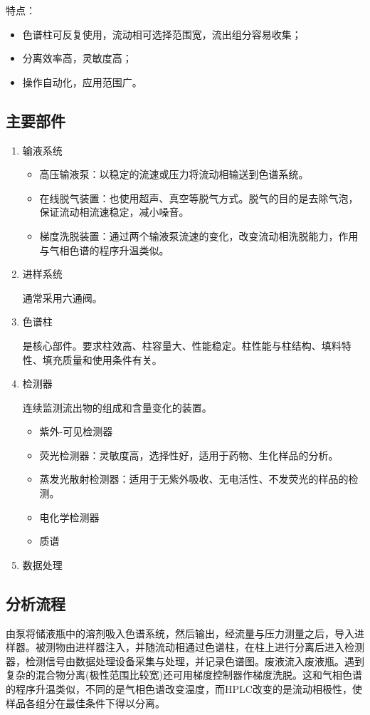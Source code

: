 特点：
\begin{itemize}
	\item 色谱柱可反复使用，流动相可选择范围宽，流出组分容易收集；
	\item 分离效率高，灵敏度高；
	\item 操作自动化，应用范围广。
\end{itemize}

\subsection{主要部件}
\begin{enumerate}
	\item 输液系统
	\begin{itemize}
		\item 高压输液泵：以稳定的流速或压力将流动相输送到色谱系统。
		\item 在线脱气装置：也使用超声、真空等脱气方式。脱气的目的是去除气泡，保证流动相流速稳定，减小噪音。
		\item 梯度洗脱装置：通过两个输液泵流速的变化，改变流动相洗脱能力，作用与气相色谱的程序升温类似。
	\end{itemize}
	\item 进样系统
	
	通常采用六通阀。
	\item 色谱柱
	
	是核心部件。要求柱效高、柱容量大、性能稳定。柱性能与柱结构、填料特性、填充质量和使用条件有关。
	\item 检测器
	
	连续监测流出物的组成和含量变化的装置。
	\begin{itemize}
		\item 紫外-可见检测器
		\item 荧光检测器：灵敏度高，选择性好，适用于药物、生化样品的分析。
		\item 蒸发光散射检测器：适用于无紫外吸收、无电活性、不发荧光的样品的检测。
		\item 电化学检测器
		\item 质谱
	\end{itemize}
	\item 数据处理
\end{enumerate}

\subsection{分析流程}
由泵将储液瓶中的溶剂吸入色谱系统，然后输出，经流量与压力测量之后，导入进样器。被测物由进样器注入，并随流动相通过色谱柱，在柱上进行分离后进入检测器，检测信号由数据处理设备采集与处理，并记录色谱图。废液流入废液瓶。遇到复杂的混合物分离(极性范围比较宽)还可用梯度控制器作梯度洗脱。这和气相色谱的程序升温类似，不同的是气相色谱改变温度，而HPLC改变的是流动相极性，使样品各组分在最佳条件下得以分离。

